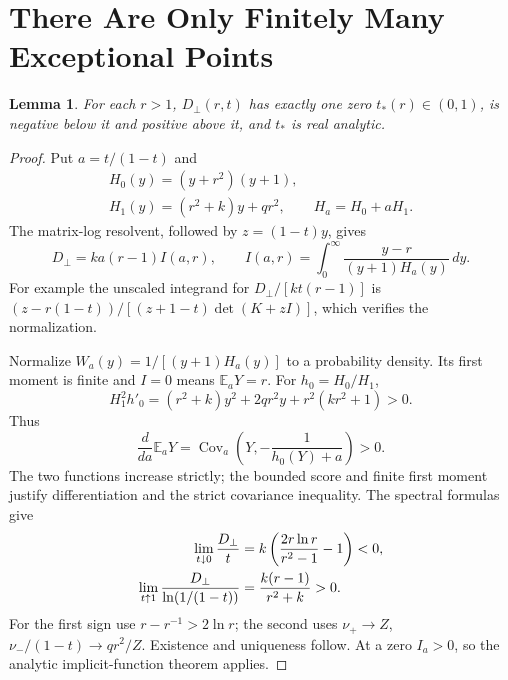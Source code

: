 \documentclass[12pt,letterpaper,onecolumn]{article}
\newtheorem{lemma}[theorem]{Lemma}
\theoremstyle{definition}
\theoremstyle{remark}
\begin{document}
\section{There Are Only Finitely Many Exceptional Points}
\begin{lemma}\label{lem:zerocurve}
For each \(r>1\), \(D_\perp(r,t)\) has exactly one zero \(t_*(r)\in(0,1)\), is negative below it and positive above it, and \(t_*\) is real analytic.
\end{lemma}
\begin{proof}
Put \(a=t/(1-t)\) and
\begin{gather*}
H_0(y)=(y+r^2)(y+1),\\
H_1(y)=(r^2+k)y+qr^2,\qquad H_a=H_0+aH_1.
\end{gather*}
The matrix-log resolvent, followed by \(z=(1-t)y\), gives
\begin{equation}\label{eq:resolvent}
D_\perp=ka(r-1)I(a,r),\qquad
I(a,r)=\int_0^\infty\frac{y-r}{(y+1)H_a(y)}\,dy.
\end{equation}
For example the unscaled integrand for \(D_\perp/[kt(r-1)]\) is
\((z-r(1-t))/[(z+1-t)\det(K+zI)]\), which verifies the normalization.

Normalize \(W_a(y)=1/[(y+1)H_a(y)]\) to a probability density. Its first moment is finite and \(I=0\) means \(\mathbb E_aY=r\).
For \(h_0=H_0/H_1\),
\[
H_1^2h'_0=(r^2+k)y^2+2qr^2y+r^2(kr^2+1)>0.
\]
Thus
\[
\frac{d}{da}\mathbb E_aY
=\operatorname{Cov}_a\left(Y,-\frac1{h_0(Y)+a}\right)>0.
\]
The two functions increase strictly; the bounded score and finite first moment justify differentiation and the strict covariance inequality.
The spectral formulas give
\begin{align}
\lim_{t\downarrow0}\frac{D_\perp}{t}
&=k\left(\frac{2r\ln r}{r^2-1}-1\right)<0,\notag\\
\lim_{t\uparrow1}\frac{D_\perp}{\ln(1/(1-t))}
&=\frac{k(r-1)}{r^2+k}>0.\label{eq:ends}
\end{align}
For the first sign use \(r-r^{-1}>2\ln r\); the second uses
\(\nu_+\to Z\), \(\nu_-/(1-t)\to qr^2/Z\).
Existence and uniqueness follow. At a zero \(I_a>0\), so the analytic implicit-function theorem applies.
\end{proof}
\end{document}
